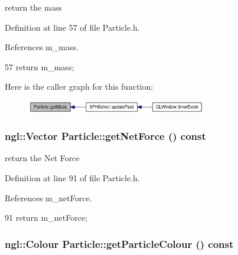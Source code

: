 return the mass 



Definition at line 57 of file Particle.h.



References m\_\-mass.




\begin{DoxyCode}
57 { return m_mass; }
\end{DoxyCode}




Here is the caller graph for this function:\nopagebreak
\begin{figure}[H]
\begin{center}
\leavevmode
\includegraphics[width=222pt]{class_particle_a51c37948e3b1e36f812be660c306c93b_icgraph}
\end{center}
\end{figure}


\hypertarget{class_particle_aa2d47cd6b196082fffc22b5f43e6d237}{
\subsubsection[{getNetForce}]{\setlength{\rightskip}{0pt plus 5cm}ngl::Vector Particle::getNetForce () const}}
\label{class_particle_aa2d47cd6b196082fffc22b5f43e6d237}


return the Net Force 



Definition at line 91 of file Particle.h.



References m\_\-netForce.




\begin{DoxyCode}
91 { return m_netForce; }
\end{DoxyCode}


\hypertarget{class_particle_a5c4df471b87953ad02ed2674583a26e4}{
\subsubsection[{getParticleColour}]{\setlength{\rightskip}{0pt plus 5cm}ngl::Colour Particle::getParticleColour () const}}
\label{class_particle_a5c4df471b87953ad02ed2674583a26e4}


